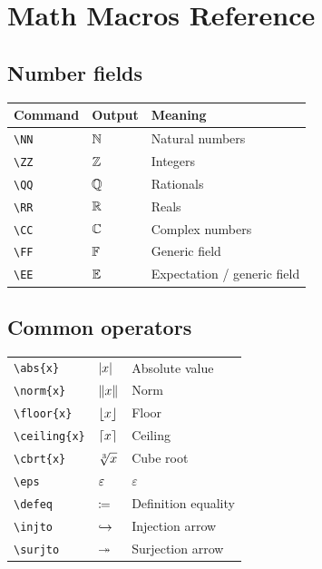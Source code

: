 \documentclass[11pt]{scrartcl}
\begin{document}
\section{Math Macros Reference}

\subsection{Number fields}

\begin{center}
\begin{tabular}{lll}
    \textbf{Command} & \textbf{Output} & \textbf{Meaning} \\
    \hline
    \verb|\NN| & $\mathbb{N}$ & Natural numbers \\
    \verb|\ZZ| & $\mathbb{Z}$ & Integers \\
    \verb|\QQ| & $\mathbb{Q}$ & Rationals \\
    \verb|\RR| & $\mathbb{R}$ & Reals \\
    \verb|\CC| & $\mathbb{C}$ & Complex numbers \\
    \verb|\FF| & $\mathbb{F}$ & Generic field \\
    \verb|\EE| & $\mathbb{E}$ & Expectation / generic field \\
\end{tabular}
\end{center}

\subsection{Common operators}

\begin{center}
\begin{tabular}{lll}
    \verb|\abs{x}|    & $\left\lvert x \right\rvert$    & Absolute value \\
    \verb|\norm{x}|   & $\left\lVert x \right\rVert$   & Norm \\
    \verb|\floor{x}|  & $\left\lfloor x \right\rfloor$  & Floor \\
    \verb|\ceiling{x}|& $\left\lceil x \right\rceil$& Ceiling \\
    \verb|\cbrt{x}|   & $\sqrt[3]{x}$   & Cube root \\
    \verb|\eps|       & $\varepsilon$       & $\varepsilon$ \\
    \verb|\defeq|     & $\coloneqq$     & Definition equality \\
    \verb|\injto|     & $\hookrightarrow$     & Injection arrow \\
    \verb|\surjto|    & $\twoheadrightarrow$    & Surjection arrow \\
\end{tabular}
\end{center}
\end{document}
